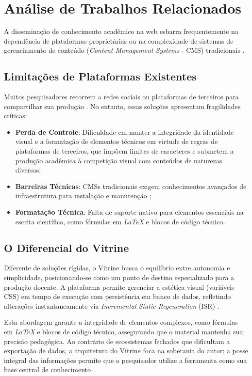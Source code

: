 \section{Análise de Trabalhos Relacionados}

A disseminação de conhecimento acadêmico na web esbarra frequentemente na dependência de plataformas proprietárias ou na complexidade de sistemas de gerenciamento de conteúdo (\textit{Content Management Systems} - CMS) tradicionais \cite{ref6}.

\subsection{Limitações de Plataformas Existentes}
Muitos pesquisadores recorrem a redes sociais ou plataformas de terceiros para compartilhar sua produção \cite{ref7}. No entanto, essas soluções apresentam fragilidades críticas:
\begin{itemize}
    \item \textbf{Perda de Controle}: Dificuldade em manter a integridade da identidade visual e a formatação de elementos técnicos em virtude de regras de plataformas de terceiros, que impõem limites de caracteres e submetem a produção acadêmica à competição visual com conteúdos de naturezas diversas;
    \item \textbf{Barreiras Técnicas}: CMSs tradicionais exigem conhecimentos avançados de infraestrutura para instalação e manutenção \cite{ref6};
    \item \textbf{Formatação Técnica}: Falta de suporte nativo para elementos essenciais na escrita científica, como fórmulas em \textit{LaTeX} e blocos de código técnico.
\end{itemize}

\subsection{O Diferencial do Vitrine}
Diferente de soluções rígidas, o Vitrine busca o equilíbrio entre autonomia e simplicidade, posicionando-se como um ponto de destino especializado para a produção docente. A plataforma permite gerenciar a estética visual (variáveis CSS) em tempo de execução com persistência em banco de dados, refletindo alterações instantaneamente via \textit{Incremental Static Regeneration} (ISR) \cite{nextjs_docs}.

Esta abordagem garante a integridade de elementos complexos, como fórmulas em \textit{LaTeX} e blocos de código técnico, assegurando que o material mantenha sua precisão pedagógica. Ao contrário de ecossistemas fechados que dificultam a exportação de dados, a arquitetura do Vitrine foca na soberania do autor: a posse integral das informações permite que o pesquisador utilize a ferramenta como sua base central de conhecimento \cite{prisma_docs}.